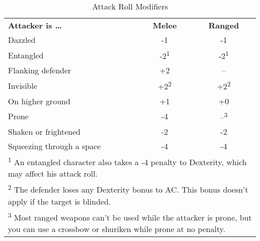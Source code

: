 \begin{table}[htb]
\caption{Attack Roll Modifiers}
\centering
\begin{tabular}{p{7cm}cc}
\textbf{Attacker is \ldots{}} & \textbf{Melee} & \textbf{Ranged}\\
Dazzled & -1 & -1\\
Entangled & -2\textsuperscript{1} & -2\textsuperscript{1}\\
Flanking defender & +2 & --\\
Invisible & +2\textsuperscript{2} & +2\textsuperscript{2}\\
On higher ground & +1 & +0\\
Prone & -4 & --\textsuperscript{3}\\
Shaken or frightened & -2 & -2\\
Squeezing through a space & -4 & -4\\
\multicolumn{3}{p{10cm}}{\textsuperscript{1} An entangled character also takes a -4 penalty to Dexterity, which may affect his attack roll.}\\
\multicolumn{3}{p{10cm}}{\textsuperscript{2} The defender loses any Dexterity bonus to AC. This bonus doesn't apply if the target is blinded.}\\
\multicolumn{3}{p{10cm}}{\textsuperscript{3} Most ranged weapons can't be used while the attacker is prone, but you can use a crossbow or shuriken while prone at no penalty.}\\
\end{tabular}
\end{table}


